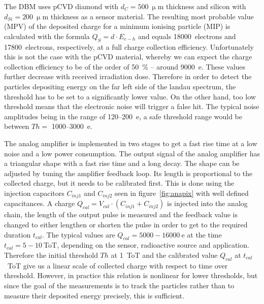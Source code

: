 \documentclass[12pt]{packages/mytustyle}  %
\begin{document}
The DBM uses pCVD diamond with $d_C=500~\upmu$m thickness and silicon with $d_{Si}=200~\upmu$m thickness as a sensor material. The resulting most probable value (MPV) of the deposited charge for a minimum ionising particle (MIP) is calculated with the formula $Q_S=d \cdot E_{e-h}$ and equals 18000~electrons and 17800~electrons, respectively, at a full charge collection efficiency. Unfortunately this is not the case with the pCVD material, whereby we can expect the charge collection efficiency to be of the order of 50~\%  -- around 9000~e. These values further decrease with received irradiation dose. Therefore in order to detect the particles depositing energy on the far left side of the landau spectrum, the threshold has to be set to a significantly lower value. On the other hand, too low threshold means that the electronic noise will trigger a false hit. The typical noise amplitudes being in the range of 120--200~e, a safe threshold range would be between $Th=$ 1000--3000~e.

The analog amplifier is implemented in two stages to get a fast rise time at a low noise and a low power consumption. The output signal of the analog amplifier has a triangular shape with a fast rise time and a long decay.  The shape can be adjusted by tuning the amplifier feedback loop. Its length is proportional to the collected charge, but it needs to be calibrated first. This is done using the injection capacitors $C_{inj1}$ and $C_{inj2}$ seen in figure~\ref{fig:anapix} with well defined capacitances. A charge $Q_{cal}=V_{cal}\cdot(C_{inj1}+C_{inj2})$ is injected into the analog chain, the length of the output pulse is measured and the feedback value is changed to either lengthen or shorten the pulse in order to get to the required duration $t_{cal}$. The typical values are $Q_{cal}=5000-16000~$e at the time $t_{cal}=5-10~$ToT, depending on the sensor, radioactive source and application. Therefore the initial threshold $Th$ at 1~ToT and the calibrated value $Q_{cal}$ at $t_{cal}$~ToT give us a linear scale of collected charge with respect to time over threshold.
However, in practice this relation is nonlinear for lower thresholds, but since the goal of the measurements is to track the particles rather than to measure their deposited energy precisely, this is sufficient. 
\end{document}
